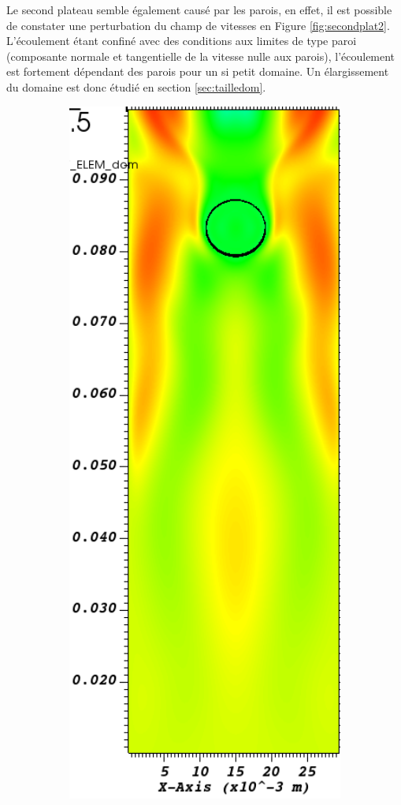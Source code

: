 Le second plateau semble également causé par les parois, en effet, il est possible de constater une perturbation du champ de vitesses en Figure \ref{fig:secondplat2}. L'écoulement étant confiné avec des conditions aux limites de type paroi (composante normale et tangentielle de la vitesse nulle aux parois), l'écoulement est fortement dépendant des parois pour un si petit domaine. Un élargissement du domaine est donc étudié en section \ref{sec:tailledom}.  
\begin{figure}[H] 
	\centering
	\begin{subfigure}[ht!]{0.18\textwidth}
		\centering
		\includegraphics[width=1\textwidth]{fig_plateau_vitesse2/visit0012.png}

\end{subfigure}
\end{figure}
